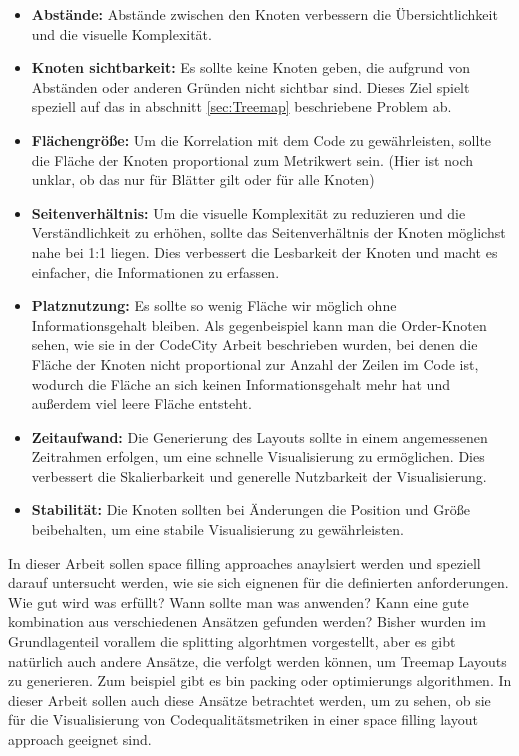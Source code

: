 \begin{itemize}
    \item \textbf{Abstände:} Abstände zwischen den Knoten verbessern die Übersichtlichkeit und die visuelle Komplexität.
    \item \textbf{Knoten sichtbarkeit:} Es sollte keine Knoten geben, die aufgrund von Abständen oder anderen Gründen nicht sichtbar sind. Dieses Ziel spielt speziell auf das in abschnitt \ref{sec:Treemap} beschriebene Problem ab.
    \item \textbf{Flächengröße:} Um die Korrelation mit dem Code zu gewährleisten, sollte die Fläche der Knoten proportional zum Metrikwert sein. (Hier ist noch unklar, ob das nur für Blätter gilt oder für alle Knoten)
    \item \textbf{Seitenverhältnis:} Um die visuelle Komplexität zu reduzieren und die Verständlichkeit zu erhöhen, sollte das Seitenverhältnis der Knoten möglichst nahe bei 1:1 liegen. Dies verbessert die Lesbarkeit der Knoten und macht es einfacher, die Informationen zu erfassen.
    \item \textbf{Platznutzung:} Es sollte so wenig Fläche wir möglich ohne Informationsgehalt bleiben. Als gegenbeispiel kann man die Order-Knoten sehen, wie sie in der CodeCity Arbeit beschrieben wurden, bei denen die Fläche der Knoten nicht proportional zur Anzahl der Zeilen im Code ist, wodurch die Fläche an sich keinen Informationsgehalt mehr hat und außerdem viel leere Fläche entsteht.
    \item \textbf{Zeitaufwand:} Die Generierung des Layouts sollte in einem angemessenen Zeitrahmen erfolgen, um eine schnelle Visualisierung zu ermöglichen. Dies verbessert die Skalierbarkeit und generelle Nutzbarkeit der Visualisierung.
    \item \textbf{Stabilität:} Die Knoten sollten bei Änderungen die Position und Größe beibehalten, um eine stabile Visualisierung zu gewährleisten. 
\end{itemize}

In dieser Arbeit sollen space filling approaches anaylsiert werden und speziell darauf untersucht werden, wie sie sich eignenen für die definierten anforderungen. Wie gut wird was erfüllt? Wann sollte man was anwenden? Kann eine gute kombination aus verschiedenen Ansätzen gefunden werden?
Bisher wurden im Grundlagenteil vorallem die splitting algorhtmen vorgestellt, aber es gibt natürlich auch andere Ansätze, die verfolgt werden können, um Treemap Layouts zu generieren. Zum beispiel gibt es bin packing oder optimierungs algorithmen. In dieser Arbeit sollen auch diese Ansätze betrachtet werden, um zu sehen, ob sie für die Visualisierung von Codequalitätsmetriken in einer space filling layout approach geeignet sind.

